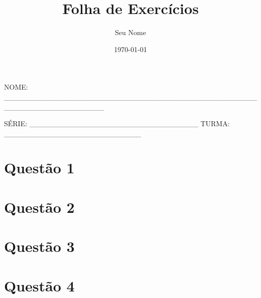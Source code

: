 \documentclass[a4paper,12pt]{article}
\title{Folha de Exercícios}
\author{Seu Nome}
\date{\today}
\begin{document}
\maketitle
\tableofcontents
\newpage

NOME: ___________________________________________________________________

SÉRIE: ________________________________ TURMA: __________________________

\section{Questão 1}
\lipsum[1]

\section{Questão 2}
\lipsum[2]

\section{Questão 3}
\lipsum[3]

\section{Questão 4}
\lipsum[4]
\end{document}
